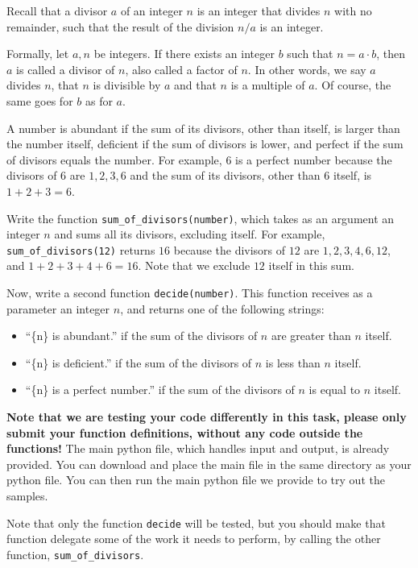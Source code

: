 
Recall that a divisor $a$ of an integer $n$ is an integer that divides $n$ with no remainder,
such that the result of the division $n / a$ is an integer.

Formally, let $a, n$ be integers. If there exists an integer $b$ such that $n = a \cdot b$,
then $a$ is called a divisor of $n$, also called a factor of $n$.
In other words, we say $a$ divides $n$, that $n$ is divisible by $a$ and that $n$ is a multiple of $a$.
Of course, the same goes for $b$ as for $a$.

A number is abundant if the sum of its divisors, other than itself, is larger than the number itself,
deficient if the sum of divisors is lower, and perfect if the sum of divisors equals the number.
For example, $6$ is a perfect number because the divisors of $6$ are $1, 2, 3, 6$
and the sum of its divisors, other than $6$ itself, is $1 + 2 + 3 = 6$.

Write the function \texttt{sum\_of\_divisors(number)},
which takes as an argument an integer $n$ and sums all its divisors, excluding itself.
For example, \texttt{sum\_of\_divisors(12)} returns $16$
because the divisors of $12$ are $1, 2, 3, 4, 6, 12$, and $1 + 2 + 3 + 4 + 6 = 16$.
Note that we exclude $12$ itself in this sum.

Now, write a second function \texttt{decide(number)}.
This function receives as a parameter an integer $n$, and returns one of the following strings:
\begin{itemize}
    \item ``\{n\} is abundant.'' if the sum of the divisors of $n$ are greater than $n$ itself.
    \item ``\{n\} is deficient.'' if the sum of the divisors of $n$ is less than $n$ itself.
    \item ``\{n\} is a perfect number.'' if the sum of the divisors of $n$ is equal to $n$ itself.
\end{itemize}

\textbf{Note that we are testing your code differently in this task,
please only submit your function definitions, without any code outside the functions!}
The main python file, which handles input and output, is already provided.
You can download and place the main file in the same directory as your python file.
You can then run the main python file we provide to try out the samples.

Note that only the function \texttt{decide} will be tested,
but you should make that function delegate some of the work it needs to perform,
by calling the other function, \texttt{sum\_of\_divisors}.

